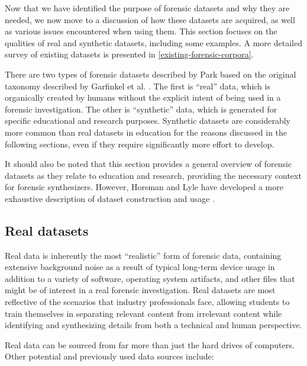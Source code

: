 \documentclass[letterpaper,12pt]{report}
\begin{document}
Now that we have identified the purpose of forensic datasets and why
they are needed, we now move to a discussion of how these datasets are
acquired, as well as various issues encountered when using them. This
section focuses on the qualities of real and synthetic datasets,
including some examples. A more detailed survey of existing datasets is
presented in \autoref{existing-forensic-corpora}.

There are two types of forensic datasets described by Park
\cite{parkTREDEVMPOPCultivating2018} based on the original taxonomy
described by Garfinkel et al.
\cite{garfinkelBringingScienceDigital2009}. The first is ``real''
data, which is organically created by humans without the explicit intent
of being used in a forensic investigation. The other is ``synthetic''
data, which is generated for specific educational and research purposes.
Synthetic datasets are considerably more common than real datasets in
education for the reasons discussed in the following sections, even if
they require significantly more effort to develop.

It should also be noted that this section provides a general overview of
forensic datasets as they relate to education and research, providing
the necessary context for forensic synthesizers. However, Horsman and
Lyle have developed a more exhaustive description of dataset
construction and usage
\cite{horsmanDatasetConstructionChallenges2021}.

\subsection{Real datasets}\label{real-datasets}

Real data is inherently the most ``realistic'' form of forensic data,
containing extensive background noise as a result of typical long-term
device usage in addition to a variety of software, operating system
artifacts, and other files that might be of interest in a real forensic
investigation. Real datasets are most reflective of the scenarios that
industry professionals face, allowing students to train themselves in
separating relevant content from irrelevant content while identifying
and synthesizing details from both a technical and human perspective.

Real data can be sourced from far more than just the hard drives of
computers. Other potential and previously used data sources include:
\end{document}
